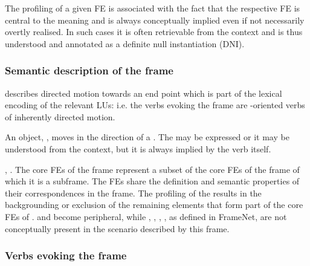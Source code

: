 \documentclass[output=paper,colorlinks,citecolor=brown]{langscibook}
\begin{document}
The profiling of a given FE is associated with the fact that the respective FE is central to the meaning and is always conceptually implied even if not necessarily overtly realised. In such cases it is often retrievable from the context and is thus understood and annotated as a definite null instantiation (DNI).


\subsubsection{}

\subsubsection{Semantic description of the  frame}

 describes directed motion towards an end point which is part of the lexical encoding of the relevant LUs: i.e. the verbs evoking the frame are -oriented verbs of inherently directed motion.   

\begin{description}[font=\normalfont]
\item[Definition of the frame \framename{Arriving}:] An object, , moves in the direction of a . The  may be expressed or it may be understood from the context, but it is always implied by the verb itself. 

\item[Core frame elements:] , . The core FEs of the  frame represent a subset of the core FEs of the   frame of which it is a subframe. The FEs share the definition and semantic properties of their correspondences in the  frame. %
The profiling of the  results in the backgrounding or exclusion of the remaining elements that form part of the core FEs of .  and  become peripheral, while , , , , as defined in FrameNet, are not conceptually present in the scenario described by this frame.
\end{description}


\subsubsection{Verbs evoking the  frame}
\end{document}
